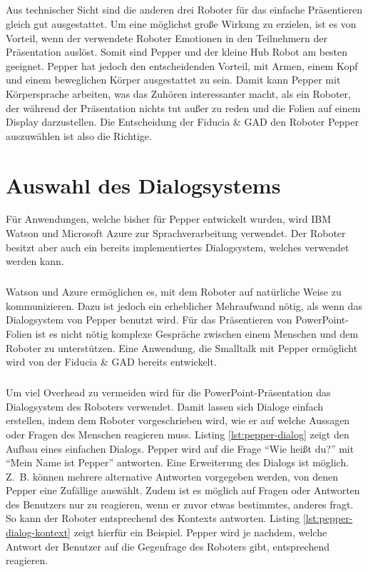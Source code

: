 \subparagraph{}
Aus technischer Sicht sind die anderen drei Roboter für das einfache
Präsentieren gleich gut ausgestattet. Um eine möglichst große Wirkung zu
erzielen, ist es von Vorteil, wenn der verwendete Roboter Emotionen in den
Teilnehmern der Präsentation auslöst. Somit sind Pepper und der kleine Hub
Robot am besten geeignet. Pepper hat jedoch den entscheidenden Vorteil, mit
Armen, einem Kopf und einem beweglichen Körper ausgestattet zu sein. Damit kann
Pepper mit Körpersprache arbeiten, was das Zuhören interessanter macht, als ein
Roboter, der während der Präsentation nichts tut außer zu reden und die Folien
auf einem Display darzustellen. Die Entscheidung der Fiducia \& GAD den Roboter
Pepper auszuwählen ist also die Richtige.

\section{Auswahl des Dialogsystems}\label{sec:auswahl-dialogsystem}
Für Anwendungen, welche bisher für Pepper entwickelt wurden, wird IBM Watson und
Microsoft Azure zur Sprachverarbeitung verwendet. Der Roboter besitzt aber auch
ein bereits implementiertes Dialogsystem, welches verwendet werden kann.

\subparagraph{}
Watson und Azure ermöglichen es, mit dem Roboter auf natürliche Weise zu
kommunizieren. Dazu ist jedoch ein erheblicher Mehraufwand nötig, als wenn das
Dialogsystem von Pepper benutzt wird. Für das Präsentieren von PowerPoint-Folien
ist es nicht nötig komplexe Gespräche zwischen einem Menschen und dem Roboter zu
unterstützen. Eine Anwendung, die Smalltalk mit Pepper ermöglicht wird von der
Fiducia \& GAD bereits entwickelt.

\subparagraph{}
Um viel Overhead zu vermeiden wird für die PowerPoint-Präsentation das
Dialogsystem des Roboters verwendet. Damit lassen sich Dialoge einfach
erstellen, indem dem Roboter vorgeschrieben wird, wie er auf welche Aussagen
oder Fragen des Menschen reagieren muss. Listing \ref{lst:pepper-dialog} zeigt
den Aufbau eines einfachen Dialogs. Pepper wird auf die Frage "`Wie heißt du?"'
mit "`Mein Name ist Pepper"' antworten. Eine Erweiterung des Dialogs ist
möglich. Z.~B. können mehrere alternative Antworten vorgegeben werden, von denen
Pepper eine Zufällige auswählt. Zudem ist es möglich auf Fragen oder Antworten
des Benutzers nur zu reagieren, wenn er zuvor etwas bestimmtes, anderes fragt.
So kann der Roboter entsprechend des Kontexts antworten. Listing
\ref{lst:pepper-dialog-kontext} zeigt hierfür ein Beispiel. Pepper wird je
nachdem, welche Antwort der Benutzer auf die Gegenfrage des Roboters gibt,
entsprechend reagieren.

